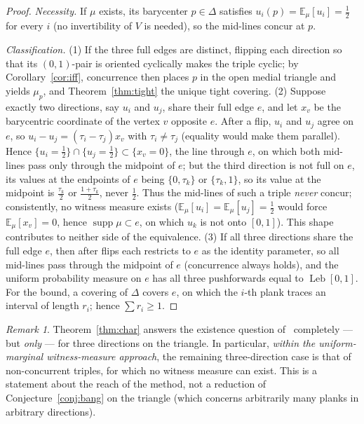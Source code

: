 \documentclass{aims}
\numberwithin{equation}{section}
\theoremstyle{plain}
\theoremstyle{definition}
\theoremstyle{remark}
\newtheorem{remark}[theorem]{Remark}
\newcommand{\Leb}{\operatorname{Leb}}
\begin{document}
\begin{proof}
\emph{Necessity.} If $\mu$ exists, its barycenter $p\in\Delta$ satisfies
$u_i(p)=\mathbb E_\mu[u_i]=\tfrac12$ for every $i$ (no invertibility of $V$ is
needed), so the mid-lines concur at $p$.

\emph{Classification.} (1) If the three full edges are distinct, flipping each
direction so that its $(0,1)$-pair is oriented cyclically makes the triple
cyclic; by Corollary~\ref{cor:iff}, concurrence then places $p$ in the open
medial triangle and yields $\mu_p$, and Theorem~\ref{thm:tight} the unique
tight covering. (2) Suppose exactly two directions, say $u_i$ and $u_j$, share
their full edge $e$, and let $x_v$ be the barycentric coordinate of the vertex
$v$ opposite $e$. After a flip, $u_i$ and $u_j$ agree on $e$, so
$u_i-u_j=(\tau_i-\tau_j)x_v$ with $\tau_i\ne\tau_j$ (equality would make them
parallel). Hence $\{u_i=\tfrac12\}\cap\{u_j=\tfrac12\}\subset\{x_v=0\}$, the
line through $e$, on which both mid-lines pass only through the midpoint of
$e$; but the third direction is not full on $e$, its values at the endpoints of
$e$ being $\{0,\tau_k\}$ or $\{\tau_k,1\}$, so its value at the midpoint is
$\tfrac{\tau_k}2$ or $\tfrac{1+\tau_k}2$, never $\tfrac12$. Thus the mid-lines
of such a triple \emph{never} concur; consistently, no witness measure exists
($\mathbb E_\mu[u_i]=\mathbb E_\mu[u_j]=\tfrac12$ would force
$\mathbb E_\mu[x_v]=0$, hence $\operatorname{supp}\mu\subset e$, on which $u_k$
is not onto $[0,1]$). This shape contributes to neither side of the
equivalence. (3) If all three directions share the full edge $e$, then after
flips each restricts to $e$ as the identity parameter, so all mid-lines pass
through the midpoint of $e$ (concurrence always holds), and the uniform
probability measure on $e$ has all three pushforwards equal to $\Leb[0,1]$.
For the bound, a covering of $\Delta$ covers $e$, on which the $i$-th plank
traces an interval of length $r_i$; hence $\sum r_i\ge1$.
\end{proof}

\begin{remark}\label{rem:charscope}
Theorem~\ref{thm:char} answers the existence question of~\cite{Gardner88}
completely --- but \emph{only} --- for three directions on the triangle. In
particular, \emph{within the
uniform-marginal witness-measure approach}, the remaining three-direction case
is that of non-concurrent triples, for which no witness measure can exist. This
is a statement about the reach of the method, not a reduction of
Conjecture~\ref{conj:bang} on the triangle (which concerns arbitrarily many
planks in arbitrary directions).
\end{remark}
\end{document}
